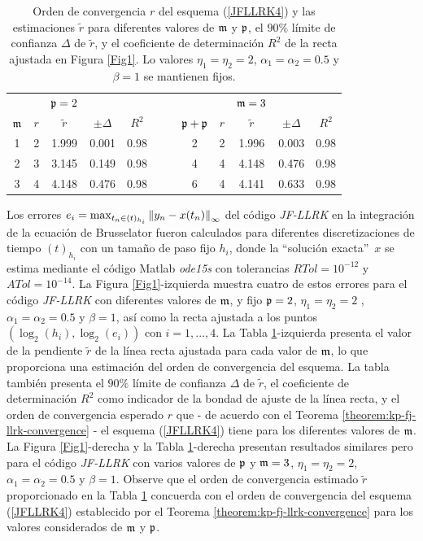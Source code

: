 \begin{table}[htb]
	\centering
	\caption{
		Orden de convergencia $r$ del esquema (\ref{JFLLRK4}) y las estimaciones $\widetilde{r}$ para diferentes valores de $\mathfrak{m}$ y $\mathfrak{p}$, el $90\%$ límite de confianza $\Delta$ de $\widetilde{r}$, y el coeficiente de determinación $R^2$ de la recta ajustada en Figura \ref{Fig1}. Lo valores $\eta_1=\eta_2=2$, $\alpha_1=\alpha_2=0.5$ y $\beta=1$ se mantienen fijos.}
	\begin{adjustbox}{width=0.8\columnwidth,center}
		\begin{tabular}{cccccllccccc}
			\cline{1-12}
			&  & $\mathfrak{p}=2$ &  &  &  &  &  &  & $\mathfrak{m}=3$ &  &  \\ \cline{2-5}\cline{9-12}
			$\mathfrak{m}$ & $r$ & $\widetilde{r}$ & $\pm \varDelta$ & $R^{2}$ &  &  & $\mathfrak{p}+\mathfrak{p}$
			& $r$ & $\widetilde{r}$ & $\pm \varDelta$ & $R^{2}$ \\ 
			\cline{1-5}\cline{8-12}
			1 & 2 & 1.999 & 0.001 & 0.98 &  &  & 2 & 2 & 1.996 & 0.003 & 0.98 \\ 
			2 & 3 & 3.145 & 0.149 & 0.98 &  &  & 4 & 4 & 4.148 & 0.476 & 0.98 \\ 
			3 & 4 & 4.148 & 0.476 & 0.98 &  &  & 6 & 4 & 4.141 & 0.633 & 0.98 \\ 
			\cline{1-12}
		\end{tabular}
	\end{adjustbox}
	\label{tab:mporders}
\end{table}


Los errores $e_i=\max_{t_n\in(t)_{h_i}}\left\lVert y_n-x(t_n) \right\rVert_\infty$ del código \textit{JF-LLRK} en la integración de la ecuación de Brusselator fueron calculados para diferentes discretizaciones de tiempo $(t)_{h_i}$ con un tamaño de paso fijo $h_i$, donde la \textquotedblleft solución exacta\textquotedblright ~$x$ se estima mediante el código Matlab \textit{ode15s} con tolerancias $RTol= 10^{-12}$ y $ATol=10^{-14}$. La Figura \ref{Fig1}-izquierda muestra cuatro de estos errores para el código \textit{JF-LLRK} con diferentes valores de $\mathfrak{m}$, y fijo $\mathfrak{p}=2$, $\eta_1=\eta_2=2$ , $\alpha_1=\alpha_2=0.5$ y $\beta=1$, así como la recta ajustada a los puntos $(\log_2(h_i),\log_2(e_i))$ con $i=1,. ..,4$. La Tabla \ref{tab:mporders}-izquierda presenta el valor de la pendiente $\widetilde{r}$ de la línea recta ajustada para cada valor de $\mathfrak{m}$, lo que proporciona una estimación del orden de convergencia del esquema. La tabla también presenta el $90\%$ límite de confianza $\varDelta$ de $\widetilde{r}$, el coeficiente de determinación $R^2$ como indicador de la bondad de ajuste de la línea recta, y el orden de convergencia esperado $r$ que - de acuerdo con el Teorema \ref {theorem:kp-fj-llrk-convergence} - el esquema (\ref{JFLLRK4}) tiene para los diferentes valores de $\mathfrak{m}$. La Figura \ref{Fig1}-derecha y la Tabla \ref{tab:mporders}-derecha presentan resultados similares pero para el código \textit{JF-LLRK} con varios valores de $\mathfrak{p}$ y $\mathfrak{m}=3$, $\eta_1=\eta_2=2$, $\alpha_1=\alpha_2=0.5$ y $\beta=1$. Observe que el orden de convergencia estimado $\widetilde{r}$ proporcionado en la Tabla \ref{tab:mporders} concuerda con el orden de convergencia del esquema (\ref{JFLLRK4}) establecido por el Teorema \ref{theorem:kp-fj-llrk-convergence} para los valores considerados de $\mathfrak{m}$ y $\mathfrak{p}$.

